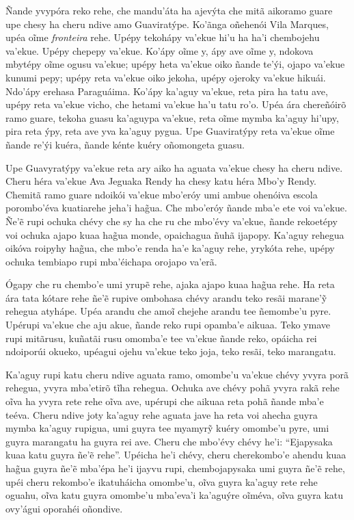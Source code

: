 Ñande yvypóra reko rehe, che mandu'áta ha ajevýta che mitã aikoramo
guare upe chesy ha cheru ndive amo Guaviratýpe. Ko'ãnga oñehenói Vila
Marques, upéa oĩme \emph{fronteira} rehe. Upépy tekohápy va'ekue hi'u ha
ha'i chembojehu va'ekue. Upépy chepepy va'ekue. Ko'ápy oĩme y, ápy ave
oĩme y, ndokova mbytépy oĩme ogusu va'ekue; upépy heta va'ekue oiko
ñande te'ýi, ojapo va'ekue kunumi pepy; upépy reta va'ekue oiko jekoha,
upépy ojeroky va'ekue hikuái. Ndo'ápy erehasa Paraguáima. Ko'ápy ka'aguy
va'ekue, reta pira ha tatu ave, upépy reta va'ekue vicho, che hetami
va'ekue ha'u tatu ro'o. Upéa ára chereñóirõ ramo guare, tekoha guasu
ka'aguypa va'ekue, reta oĩme mymba ka'aguy hi'upy, pira reta ýpy, reta
ave yva ka'aguy pygua. Upe Guaviratýpy reta va'ekue oĩme ñande re'ýi
kuéra, ñande kénte kuéry oñomongeta guasu.

Upe Guavyratýpy va'ekue reta ary aiko ha aguata va'ekue chesy ha cheru
ndive. Cheru héra va'ekue Ava Jeguaka Rendy ha chesy katu héra Mbo'y
Rendy. Chemitã ramo guare ndoikói va'ekue mbo'eróy umi ambue ohenóiva
escola porombo'éva kuatiarehe jeha'i hag̃ua. Che mbo'eróy ñande mba'e ete
voi va'ekue. Ñe'ẽ rupi ochuka chévy che sy ha che ru che mbo'évy
va'ekue, ñande rekoetépy voi ochuka ajapo kuaa hag̃ua monde, opaichagua
ñuhã ijapopy. Ka'aguy rehegua oikóva roipyhy hag̃ua, che mbo'e renda ha'e
ka'aguy rehe, yrykóta rehe, upépy ochuka tembiapo rupi mba'éichapa
orojapo va'erã.

Ógapy che ru chembo'e umi yrupẽ rehe, ajaka ajapo kuaa hag̃ua rehe. Ha
reta ára tata kótare rehe ñe'ẽ rupive ombohasa chévy arandu teko resãi
marane'ỹ rehegua atyhápe. Upéa arandu che amoĩ chejehe arandu tee
ñemombe'u pyre. Upérupi va'ekue che aju akue, ñande reko rupi opamba'e
aikuaa. Teko ymave rupi mitãrusu, kuñatãi rusu omomba'e tee va'ekue
ñande reko, opáicha rei ndoiporúi okueko, upéagui ojehu va'ekue teko
joja, teko resãi, teko marangatu.

Ka'aguy rupi katu cheru ndive aguata ramo, omombe'u va'ekue chévy yvyra
porã rehegua, yvyra mba'etirõ tĩha rehegua. Ochuka ave chévy pohã yvyra
rakã rehe oĩva ha yvyra rete rehe oĩva ave, upérupi che aikuaa reta pohã
ñande mba'e teéva. Cheru ndive joty ka'aguy rehe aguata jave ha reta voi
ahecha guyra mymba ka'aguy rupigua, umi guyra tee myamyrỹ kuéry omombe'u
pyre, umi guyra marangatu ha guyra rei ave. Cheru che mbo'évy chévy
he'i: ``Ejapysaka kuaa katu guyra ñe'ẽ rehe''. Upéicha he'i chévy, cheru
cherekombo'e ahendu kuaa hag̃ua guyra ñe'ẽ mba'épa he'i ijayvu rupi,
chembojapysaka umi guyra ñe'ẽ rehe, upéi cheru rekombo'e ikatuháicha
omombe'u, oĩva guyra ka'aguy rete rehe oguahu, oĩva katu guyra omombe'u
mba'eva'i ka'aguýre oĩméva, oĩva guyra katu ovy'águi oporahéi oñondive.

